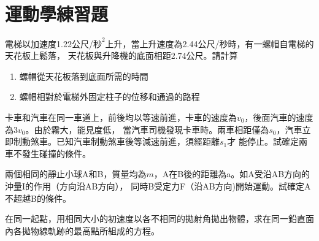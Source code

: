 \documentclass[cn,10pt,math=newtx,chinesefont=founder]{../elegantbook}
\begin{document}
\section{運動學練習題}

\begin{example}
    電梯以加速度1.22公尺/$秒^2$上升，當上升速度為2.44公尺/秒時，有一螺帽自電梯的天花板上鬆落，
    天花板與升降機的底面相距2.74公尺。請計算
    \begin{enumerate}
        \item 螺帽從天花板落到底面所需的時間
        \item 螺帽相對於電梯外固定柱子的位移和通過的路程
    \end{enumerate}

    \rightline{[練2-2]}
\end{example}
\newpage

\begin{example}
    卡車和汽車在同一車道上，前後均以等速前進，卡車的速度為$v_0$，後面汽車的速度為$3v_0$。由於霧大，能見度低，
    當汽車司機發現卡車時。兩車相距僅為$s_0$，汽車立即制動煞車。已知汽車制動煞車後等減速前進，須經距離$s_1$才
    能停止。試確定兩車不發生碰撞的條件。\\
    \rightline{[練2-3]}
\end{example}
\newpage

\begin{example}
    兩個相同的靜止小球A和B，質量均為$m$，A在B後的距離為a。如A受沿AB方向的沖量I的作用（方向沿AB方向），
    同時B受定力F（沿AB方向)開始運動。試確定A不超越B的條件。\\
    \rightline{[練2-4]}
\end{example}
\newpage

\begin{example}
    在同一起點，用相同大小的初速度以各不相同的拋射角拋出物體，求在同一鉛直面內各拋物線軌跡的最高點所組成的方程。\\
    \rightline{[練2-5]}
\end{example}    
\newpage
\end{document}
